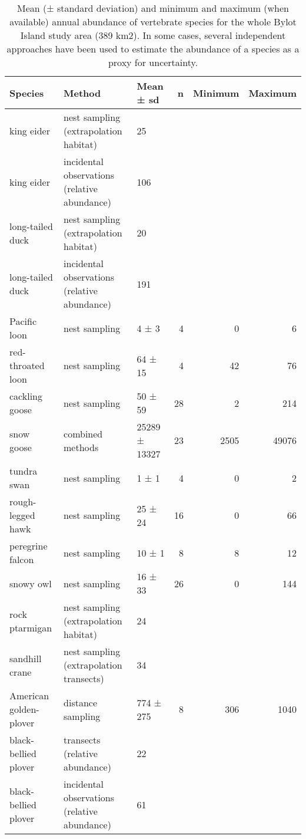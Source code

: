 \begin{table}[ht]
\centering
\caption{Mean (± standard deviation) and minimum and maximum (when available) annual abundance of vertebrate species for the whole Bylot Island study area (389 km2). In some cases, several independent approaches have been used to estimate the abundance of a species as a proxy for uncertainty.} 
\label{table:species_mean_abudance}
\begingroup\fontsize{8pt}{10pt}\selectfont
\begin{tabularx}{\textwidth}{lllrrr}
  \hline
Species & Method & Mean ± sd & n & Minimum & Maximum \\ 
  \hline
king eider & nest sampling (extrapolation habitat) & 25 &  &  &  \\ 
  king eider & incidental observations (relative abundance) & 106 &  &  &  \\ 
  long-tailed duck & nest sampling (extrapolation habitat) & 20 &  &  &  \\ 
  long-tailed duck & incidental observations (relative abundance) & 191 &  &  &  \\ 
  Pacific loon & nest sampling & 4 ± 3 &   4 &   0 &   6 \\ 
  red-throated loon & nest sampling & 64 ± 15 &   4 &  42 &  76 \\ 
  cackling goose & nest sampling & 50 ± 59 &  28 &   2 & 214 \\ 
  snow goose & combined methods & 25289 ± 13327 &  23 & 2505 & 49076 \\ 
  tundra swan & nest sampling & 1 ± 1 &   4 &   0 &   2 \\ 
  rough-legged hawk & nest sampling & 25 ± 24 &  16 &   0 &  66 \\ 
  peregrine falcon & nest sampling & 10 ± 1 &   8 &   8 &  12 \\ 
  snowy owl & nest sampling & 16 ± 33 &  26 &   0 & 144 \\ 
  rock ptarmigan & nest sampling (extrapolation habitat) & 24 &  &  &  \\ 
  sandhill crane & nest sampling (extrapolation transects) & 34 &  &  &  \\ 
  American golden-plover & distance sampling & 774 ± 275 &   8 & 306 & 1040 \\ 
  black-bellied plover & transects (relative abundance) & 22 &  &  &  \\ 
  black-bellied plover & incidental observations (relative abundance) & 61 &  &  &  \\ 

\end{tabularx}
\end{table}
